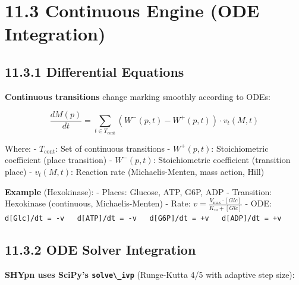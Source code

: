 \hypertarget{continuous-engine-ode-integration}{%
\section{11.3 Continuous Engine (ODE
Integration)}\label{continuous-engine-ode-integration}}

\hypertarget{differential-equations}{%
\subsection{11.3.1 Differential
Equations}\label{differential-equations}}

\textbf{Continuous transitions} change marking smoothly according to
ODEs:

\[
\frac{dM(p)}{dt} = \sum_{t \in T_{\text{cont}}} \left( W^-(p,t) - W^+(p,t) \right) \cdot v_t(M, t)
\]

Where: - \(T_{\text{cont}}\): Set of continuous transitions -
\(W^+(p,t)\): Stoichiometric coefficient (place \textrightarrow transition) -
\(W^-(p,t)\): Stoichiometric coefficient (transition \textrightarrow place) -
\(v_t(M, t)\): Reaction rate (Michaelis-Menten, mass action, Hill)

\textbf{Example} (Hexokinase): - Places: Glucose, ATP, G6P, ADP -
Transition: Hexokinase (continuous, Michaelis-Menten) - Rate:
\(v = \frac{V_{\max} \cdot [Glc]}{K_m + [Glc]}\) - ODE:
\passthrough{\lstinline!d[Glc]/dt = -v   d[ATP]/dt = -v   d[G6P]/dt = +v   d[ADP]/dt = +v!}

\hypertarget{ode-solver-integration}{%
\subsection{11.3.2 ODE Solver
Integration}\label{ode-solver-integration}}

\textbf{SHYpn uses SciPy's \passthrough{\lstinline!solve\_ivp!}}
(Runge-Kutta 4/5 with adaptive step size):

